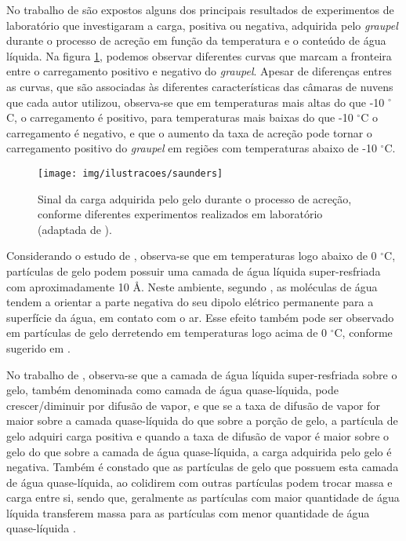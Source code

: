 No trabalho de  são expostos alguns dos principais resultados de experimentos de laboratório que investigaram a carga, positiva ou negativa, adquirida pelo \textit{graupel} durante o processo de acreção em função da temperatura e o conteúdo de água líquida. Na figura  \ref{fig:saunders}, podemos observar diferentes curvas que marcam a fronteira entre o carregamento positivo e negativo do \textit{graupel}. Apesar de diferenças entres as curvas, que são associadas às diferentes características das câmaras de nuvens que cada autor utilizou, observa-se que em temperaturas mais altas do que -10 $^{\circ}$C, o carregamento é positivo, para temperaturas mais baixas do que -10 $^{\circ}$C o carregamento é negativo, e que o aumento da taxa de acreção pode tornar o carregamento positivo do \textit{graupel} em regiões com temperaturas abaixo de -10 $^{\circ}$C.

 


\begin{figure}[htp]
\centering 
\texttt{[image: img/ilustracoes/saunders]}
\caption{Sinal da carga adquirida pelo gelo durante o processo de acreção, conforme diferentes experimentos realizados em laboratório (adaptada de ).}
\label{fig:saunders}
\end{figure}

Considerando o estudo de , observa-se que em temperaturas logo abaixo de 0 $^{\circ}$C, partículas de gelo podem possuir uma camada de água líquida super-resfriada com aproximadamente 10 {\AA}. Neste ambiente, segundo , as moléculas de água tendem a orientar a parte negativa do seu dipolo elétrico permanente para a superfície da água, em contato com o ar. Esse efeito também pode ser observado em partículas de gelo derretendo em temperaturas logo acima de 0 $^{\circ}$C, conforme sugerido em .

No trabalho de , observa-se que a camada de água líquida super-resfriada sobre o gelo, também denominada como camada de água quase-líquida, pode crescer/diminuir por difusão de vapor, e que se a taxa de difusão de vapor for maior sobre a camada quase-líquida do que sobre a porção de gelo, a partícula de gelo adquiri carga positiva e quando a taxa de difusão de vapor é maior sobre o gelo do que sobre a camada de água quase-líquida, a carga adquirida pelo gelo é negativa. Também é constado que as partículas de gelo que possuem esta camada de água quase-líquida, ao colidirem com outras partículas podem trocar massa e carga entre si, sendo que, geralmente as partículas com maior quantidade de água líquida transferem massa para as partículas com menor quantidade de água quase-líquida \cite{baker1994}. 


